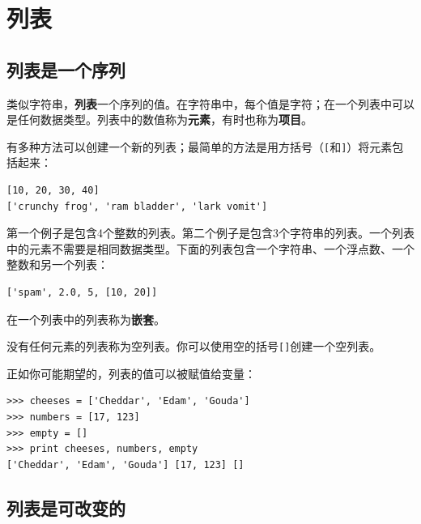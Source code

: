 \chapter{列表}



\section{列表是一个序列}

类似字符串，{\bf 列表}一个序列的值。在字符串中，每个值是字符；在一个列表中可以是任何数据类型。列表中的数值称为{\bf 元素}，有时也称为{\bf 项目}。


有多种方法可以创建一个新的列表；最简单的方法是用方括号（\verb"["和\verb"]"）将元素包括起来：

\beforeverb
\begin{verbatim}
[10, 20, 30, 40]
['crunchy frog', 'ram bladder', 'lark vomit']
\end{verbatim}
\afterverb
%
第一个例子是包含4个整数的列表。第二个例子是包含3个字符串的列表。一个列表中的元素不需要是相同数据类型。下面的列表包含一个字符串、一个浮点数、一个整数和另一个列表：

\beforeverb
\begin{verbatim}
['spam', 2.0, 5, [10, 20]]
\end{verbatim}
\afterverb
%
在一个列表中的列表称为{\bf 嵌套}。


没有任何元素的列表称为空列表。你可以使用空的括号\verb"[]"创建一个空列表。


正如你可能期望的，列表的值可以被赋值给变量：

\beforeverb
\begin{verbatim}
>>> cheeses = ['Cheddar', 'Edam', 'Gouda']
>>> numbers = [17, 123]
>>> empty = []
>>> print cheeses, numbers, empty
['Cheddar', 'Edam', 'Gouda'] [17, 123] []
\end{verbatim}
\afterverb
%




\section{列表是可改变的}

